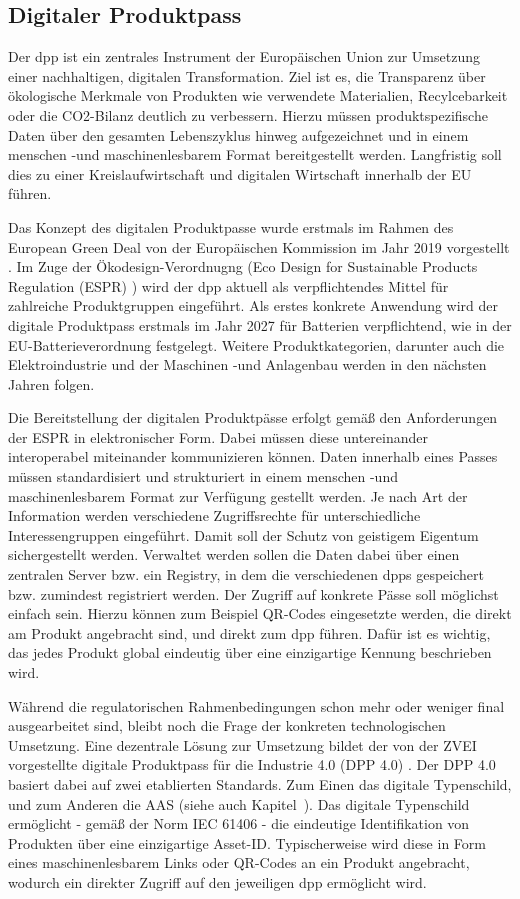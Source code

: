 \subsection{Digitaler Produktpass}
Der \ac{dpp} ist ein zentrales Instrument der Europäischen Union zur Umsetzung einer nachhaltigen, digitalen Transformation.
Ziel ist es, die Transparenz über ökologische Merkmale von Produkten wie verwendete Materialien, Recylcebarkeit oder die CO2-Bilanz deutlich zu verbessern.
Hierzu müssen produktspezifische Daten über den gesamten Lebenszyklus hinweg aufgezeichnet und in einem menschen -und maschinenlesbarem Format bereitgestellt werden.
Langfristig soll dies zu einer Kreislaufwirtschaft und digitalen Wirtschaft innerhalb der EU führen.

Das Konzept des digitalen Produktpasse wurde erstmals im Rahmen des European Green Deal von der Europäischen Kommission im Jahr 2019 vorgestellt \cite{GreenDeal}.
Im Zuge der Ökodesign-Verordnugng (Eco Design for Sustainable Products Regulation (ESPR) ) \cite{ESPR} wird der \acs{dpp} aktuell als verpflichtendes Mittel für zahlreiche Produktgruppen eingeführt.
Als erstes konkrete Anwendung wird der digitale Produktpass erstmals im Jahr 2027 für Batterien verpflichtend, wie in der EU-Batterieverordnung festgelegt.
Weitere Produktkategorien, darunter auch die Elektroindustrie und der Maschinen -und Anlagenbau werden in den nächsten Jahren folgen.

Die Bereitstellung der digitalen Produktpässe erfolgt gemäß den Anforderungen der ESPR in elektronischer Form. Dabei müssen diese untereinander interoperabel miteinander kommunizieren können.
Daten innerhalb eines Passes müssen standardisiert und strukturiert in einem menschen -und maschinenlesbarem Format zur Verfügung gestellt werden.
Je nach Art der Information werden verschiedene Zugriffsrechte für unterschiedliche Interessengruppen eingeführt. Damit soll der Schutz von geistigem Eigentum sichergestellt werden.
Verwaltet werden sollen die Daten dabei über einen zentralen Server bzw. ein Registry, in dem die verschiedenen \acsp{dpp} gespeichert bzw. zumindest registriert werden.
Der Zugriff auf konkrete Pässe soll möglichst einfach sein. Hierzu können zum Beispiel QR-Codes eingesetzte werden, die direkt am Produkt angebracht sind, und direkt zum \acs{dpp} führen.
Dafür ist es wichtig, das jedes Produkt global eindeutig über eine einzigartige Kennung beschrieben wird.
\cite{CIRPASS}

Während die regulatorischen Rahmenbedingungen schon mehr oder weniger final ausgearbeitet sind, bleibt noch die Frage der konkreten technologischen Umsetzung.
Eine dezentrale Lösung zur Umsetzung bildet der von der ZVEI vorgestellte digitale Produktpass für die Industrie 4.0 (DPP 4.0) \cite{DPP40}.
Der DPP 4.0 basiert dabei auf zwei etablierten Standards. Zum Einen das digitale Typenschild, und zum Anderen die AAS (siehe auch Kapitel~).
Das digitale Typenschild ermöglicht - gemäß der Norm IEC 61406 \cite{TypenschildIEC61406-1} - die eindeutige Identifikation von Produkten über eine einzigartige Asset-ID.
Typischerweise wird diese in Form eines maschinenlesbarem Links oder QR-Codes an ein Produkt angebracht, wodurch ein direkter Zugriff auf den jeweiligen \acs{dpp} ermöglicht wird.

